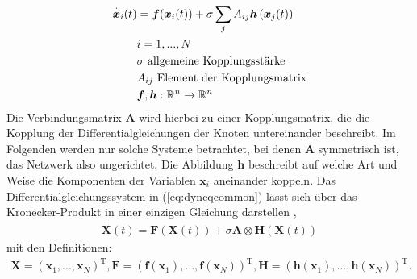 \begin{align}\label{eq:dyneqcommon}
\overset{\cdot}{\boldsymbol{x}}_i(t)&=\boldsymbol{f}(\boldsymbol{x}_i(t))+\sigma\sum_j A_{ij}\boldsymbol{h}\left(\boldsymbol{x}_j(t)\right)
\\\notag & i=1,...,N
\\\notag & \sigma \text{ allgemeine Kopplungsstärke}
\\\notag & A_{ij}\text{ Element der Kopplungsmatrix}
\\\notag & \boldsymbol{f},\boldsymbol{h}:\mathbb{R}^n\rightarrow\mathbb{R}^n
\end{align}
Die Verbindungsmatrix $\boldsymbol{A}$ wird hierbei zu einer Kopplungsmatrix, die die Kopplung der Differentialgleichungen der Knoten untereinander beschreibt. Im Folgenden werden nur solche Systeme betrachtet, bei denen $\boldsymbol{A}$ symmetrisch ist, das Netzwerk also ungerichtet. Die Abbildung $\boldsymbol{h}$ beschreibt auf welche Art und Weise die Komponenten der Variablen $\boldsymbol{x}_i$ aneinander koppeln. Das Differentialgleichungssystem in (\ref*{eq:dyneqcommon}) lässt sich über das Kronecker-Produkt in einer einzigen Gleichung darstellen \citep{pecora1998},
\begin{align}
\overset{\cdot}{\boldsymbol{X}}(t)=\boldsymbol{F}(\boldsymbol{X}(t))+\sigma\boldsymbol{A}\otimes\boldsymbol{H}(\boldsymbol{X}(t))
\end{align}
mit den Definitionen:
\begin{align*}
\boldsymbol{X}=\left(\boldsymbol{x}_1,...,\boldsymbol{x}_N\right)^{\text{T}},
\boldsymbol{F}=\left(\boldsymbol{f}(\boldsymbol{x}_1),...,\boldsymbol{f}(\boldsymbol{x}_N)\right)^{\text{T}},
\boldsymbol{H}=\left(\boldsymbol{h}(\boldsymbol{x}_1),...,\boldsymbol{h}(\boldsymbol{x}_N)\right)^{\text{T}}.
\end{align*}


